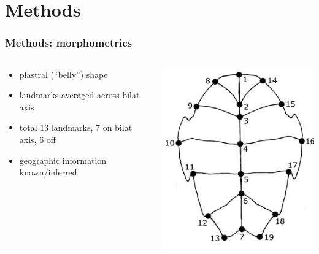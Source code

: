 \documentclass{beamer}\usepackage{graphicx, color}
\begin{document}
\section{Methods}
\begin{frame}
  \frametitle{Methods: morphometrics}
  \begin{columns}
    \begin{column}{0.5\textwidth}
      \begin{itemize}
        \item plastral (``belly'') shape
        \item landmarks averaged across bilat axis
        \item total 13 landmarks, 7 on bilat axis, 6 off
        \item geographic information known/inferred
      \end{itemize}
    \end{column}
    \begin{column}{0.5\textwidth}
      \centering
      \includegraphics[width = \textwidth, keepaspectratio = true]{figure/plastra}
    \end{column}
  \end{columns}
\end{frame}
\end{document}
